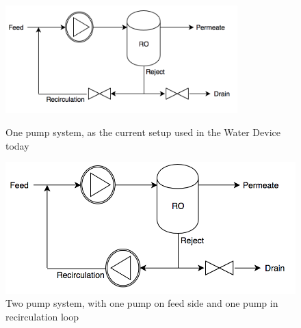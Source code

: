 \begin{figure}[h]
\centering
\begin{minipage}{.5\textwidth}
    \centering
    \includegraphics[width=0.8\textwidth]{Sys1}
    \caption{One pump system, as the current setup used in the Water Device today}
    \label{fig:System1}
\end{minipage}%
\begin{minipage}{.5\textwidth}
  \centering
  \includegraphics[width=.8\linewidth]{Sys2}
  \caption{Two pump system, with one pump on feed side and one pump in recirculation loop}
  \label{fig:System2}
\end{minipage}
\end{figure}

\newpage

